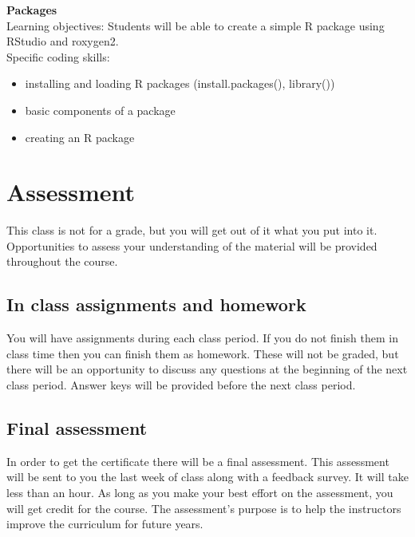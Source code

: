 \documentclass[paper=a4, fontsize=11pt]{scrartcl} %
\numberwithin{equation}{section} %
\numberwithin{figure}{section} %
\numberwithin{table}{section} %
\begin{document}
\textbf{Packages} \\
Learning objectives: Students will be able to create a simple R package using RStudio and roxygen2. \\
Specific coding skills:
\begin{itemize}
	\item{installing and loading R packages (install.packages(), library())}
	\item{basic components of a package}
	\item{creating an R package}
\end{itemize}  



\section{Assessment}

This class is not for a grade, but you will get out of it what you put into it. Opportunities to assess your understanding of the material will be provided throughout the course. 


\subsection{In class assignments and homework}

You will have assignments during each class period. If you do not finish them in class time then you can finish them as homework. These will not be graded, but there will be an opportunity to discuss any questions at the beginning of the next class period. Answer keys will be provided before the next class period. 

\subsection{Final assessment}

In order to get the certificate there will be a final assessment. This assessment will be sent to you the last week of class along with a feedback survey. It will take less than an hour. As long as you make your best effort on the assessment, you will get credit for the course. The assessment's purpose is to help the instructors improve the curriculum for future years. 
\end{document}
